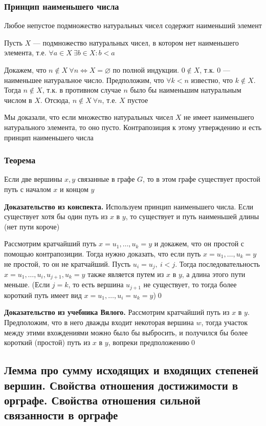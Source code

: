 \documentclass[a4paper]{article}
\begin{document}
\subsubsection*{Принцип наименьшего числа}
\theorem Любое непустое подмножество натуральных чисел содержит наименьший элемент

\proof Пусть $X$ — подмножество натуральных чисел, в котором нет наименьшего элемента, т.е. $\forall a\in X\ \exists b\in X:b<a$

Докажем, что $n\notin X\ \forall n\iff X=\varnothing$ по полной индукции. $0\notin X$, т.к. 0 — наименьшее натуральное число. Предположим, что $\forall k<n$ известно, что $k\notin X$. Тогда $n\notin X$, т.к. в противном случае $n$ было бы наименьшим натуральным числом в $X$. Отсюда, $n\notin X\ \forall n$, т.е. $X$ пустое

Мы доказали, что если множество натуральных чисел $X$ не имеет наименьшего натурального элемента, то оно пусто. Контрапозиция к этому утверждению и есть принцип наименьшего числа
\subsubsection*{Теорема}
\theorem Если две вершины $x,y$ связанные в графе $G$, то в этом графе существует простой путь с началом $x$ и концом $y$

\textbf{Доказательство из конспекта.} Используем принцип наименьшего числа. Если существует хотя бы один путь из $x$ в $y$, то существует и путь наименьшей длины (нет пути короче)

Рассмотрим кратчайший путь $x=u_1,\ldots,u_k=y$ и докажем, что он простой с помощью контрапозиции. Тогда нужно доказать, что если путь $x=u_1,\ldots,u_k=y$ не простой, то он не кратчайший. Пусть $u_i=u_j,\ i<j$. Тогда последовательность $x=u_1,\ldots,u_i,u_{j+1},u_k=y$ также является путем из $x$ в $y$, а длина этого пути меньше. (Если $j = k$, то есть вершина $u_{j+1}$ не существует, то тогда более короткий путь имеет вид $x=u_1,\ldots,u_i=u_k=y$)\qed 

\textbf{Доказательство из учебника Вялого.} Рассмотрим кратчайший путь из $x$ в $y$. Предположим, что в него дважды входит некоторая вершина $w$, тогда участок между этими вхождениями можно было бы выбросить, и получился бы более короткий (простой) путь из $x$ в $y$, вопреки предположению\qed 


\subsection{Лемма про сумму исходящих и входящих степеней вершин. Свойства отношения достижимости в орграфе. Свойства отношения сильной связанности в орграфе}
\end{document}

